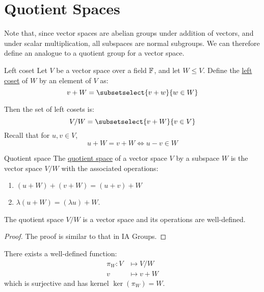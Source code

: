 \documentclass[../Main.tex]{subfiles}
\begin{document}
\section{Quotient Spaces}
Note that, since vector spaces are abelian groups under addition of vectors, and under scalar multiplication, all subspaces are normal subgroups. We can therefore define an analogue to a quotient group for a vector space.
\begin{definition}{Left coset}
    Let $V$ be a vector space over a field $\mathbb{F}$, and let $W \leq V$. Define the \underline{left coset} of $W$ by an element of $V$ as:
    \begin{equation*}
        v + W = \subsetselect{v + w}{w \in W} 
    \end{equation*}
\end{definition}
Then the set of left cosets is:
\begin{equation*}
    V / W = \subsetselect{v + W}{v \in V}
\end{equation*}
Recall that for $u, v \in V$,
\begin{equation}
    u + W = v + W \Leftrightarrow u - v \in W
    \label{eqnCosetEquality}
\end{equation}
\begin{definition}{Quotient space}
    The \underline{quotient space} of a vector space $V$ by a subspace $W$ is the vector space $V / W$ with the associated operations:
    \begin{enumerate}
        \item $(u + W) + (v + W) = (u + v) + W$
        \item $\lambda(u + W) = (\lambda u) + W$.
    \end{enumerate}
\end{definition}
\begin{proposition}
    The quotient space $V / W$ is a vector space and its operations are well-defined.
    \label{propQuotientSpace}
\end{proposition}
\begin{proof}
    The proof is similar to that in IA Groups.
\end{proof}
\begin{proposition}
    There exists a well-defined function:
    \begin{align*}
        \pi_W : V &\mapsto V / W \\
        v &\mapsto v + W
    \end{align*}
    which is surjective and has kernel $\ker(\pi_W) = W$.
    \label{propQuotMap}
\end{proposition}
\end{document}
